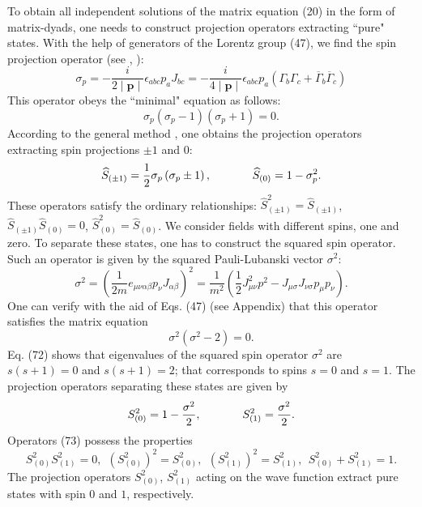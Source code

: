\documentclass[a4paper,12pt]{article}
\begin{document}
To obtain all independent solutions of the matrix equation (20) in
the form of matrix-dyads, one needs to construct projection
operators \cite{Fedorov} extracting ``pure" states. With the help
of generators of the Lorentz group (47), we find the spin
projection operator (see \cite{Kruglov1}, \cite{monogr}):
\begin{equation}
\sigma _p=-\frac i{2\mid \mathbf{p}\mid }\epsilon
_{abc}p_aJ_{bc}=-\frac i{4\mid \mathbf{p}\mid }\epsilon
_{abc}p_a\left( \Gamma _b\Gamma _c+ \overline{\Gamma
}_b\overline{\Gamma }_c\right)  \label{68}
\end{equation}
This operator obeys the ``minimal" equation as follows:
\begin{equation}
\sigma _p\left( \sigma _p-1\right) \left( \sigma _p+1\right) =0 .
\label{69}
\end{equation}
According to the general method \cite{Fedorov}, one obtains the
projection operators extracting spin projections $\pm 1$ and $0$:
\begin{equation}
\widehat{S}_{(\pm 1)}=\frac 12\sigma _p\left( \sigma _p\pm
1\right) ,\hspace{0.5in}\widehat{S}_{(0)}=1-\sigma _p^2
.\label{70}
\end{equation}
These operators satisfy the ordinary relationships:
$\widehat{S}_{(\pm 1)}^2=\widehat{S}_{(\pm 1)}$, $\widehat{S}
_{(\pm 1)}\widehat{S}_{(0)}=0$,
$\widehat{S}_{(0)}^2=\widehat{S}_{(0)}$. We consider fields with
different spins, one and zero. To separate these states, one has
to construct the squared spin operator. Such an operator is given
by the squared Pauli-Lubanski vector $\sigma ^2$:
\begin{equation}
\sigma ^2=\left( \frac 1{2m}e_{\mu \nu \alpha \beta }p_\nu
J_{\alpha \beta }\right) ^2=\frac 1{m^2}\left( \frac{1}{2}J_{\mu
\nu }^2p^2-J_{\mu \sigma }J_{\nu \sigma }p_\mu p_\nu \right) .
\label{71}
\end{equation}
One can verify with the aid of Eqs. (47) (see Appendix) that this
operator satisfies the matrix equation
\begin{equation}
\sigma ^2\left( \sigma ^2-2\right) =0 . \label{72}
\end{equation}
Eq. (72) shows that eigenvalues of the squared spin operator
$\sigma ^2$ are $s(s+1)=0$ and $s(s+1)=2$; that corresponds to
spins $s=0$ and $s=1$. The projection operators separating these
states are given by
\begin{equation}
S_{(0)}^2=1-\frac{\sigma ^2}2
,\hspace{0.5in}S_{(1)}^2=\frac{\sigma ^2}2 .\label{73}
\end{equation}
Operators (73) possess the properties
\[
S_{(0)}^2S_{(1)}^2=0 ,~~\left( S_{(0)}^2\right) ^2=S_{(0)}^2 ,
~~\left( S_{(1)}^2\right) ^2=S_{(1)}^2 ,~~ S_{(0)}^2+S_{(1)}^2= 1
.
\]
The projection operators $S_{(0)}^2$, $S_{(1)}^2$ acting on the
wave function extract pure states with spin $0$ and $1$,
respectively.
\end{document}
